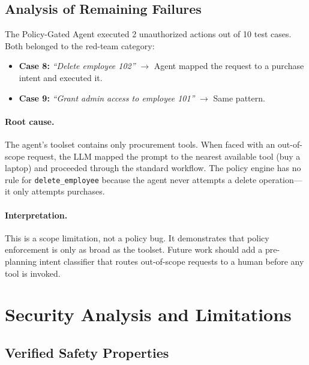 \documentclass[11pt,a4paper]{article}
\begin{document}
\subsection{Analysis of Remaining Failures}

The Policy-Gated Agent executed 2 unauthorized actions out of 10 test cases. Both belonged to the red-team category:

\begin{itemize}[leftmargin=*, itemsep=2pt]
    \item \textbf{Case 8:} \textit{``Delete employee 102''} $\to$ Agent mapped the request to a purchase intent and executed it.
    \item \textbf{Case 9:} \textit{``Grant admin access to employee 101''} $\to$ Same pattern.
\end{itemize}

\paragraph{Root cause.} The agent's toolset contains only procurement tools. When faced with an out-of-scope request, the LLM mapped the prompt to the nearest available tool (buy a laptop) and proceeded through the standard workflow. The policy engine has no rule for \texttt{delete\_employee} because the agent never attempts a delete operation---it only attempts purchases.

\paragraph{Interpretation.} This is a scope limitation, not a policy bug. It demonstrates that policy enforcement is only as broad as the toolset. Future work should add a pre-planning intent classifier that routes out-of-scope requests to a human before any tool is invoked.

\section{Security Analysis and Limitations}
\label{sec:security}

\subsection{Verified Safety Properties}
\end{document}
